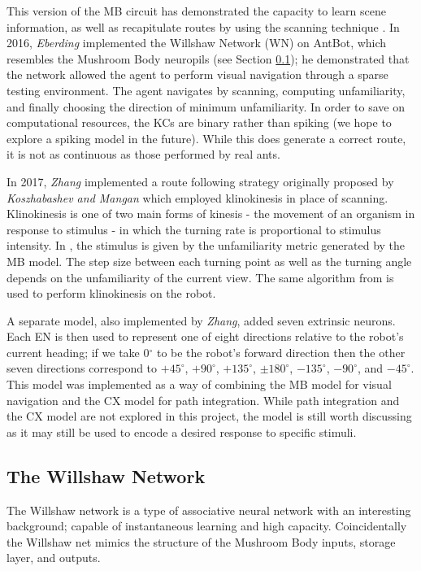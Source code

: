 \documentclass[a4paper,11pt,twoside,openright]{article}
\begin{document}
This version of the MB circuit has demonstrated the capacity to learn scene information, as well
as recapitulate routes by using the scanning technique \cite{Ardin2016}. In 2016, \textit{Eberding}
implemented the Willshaw Network (WN) on AntBot, which resembles the Mushroom Body neuropils (see Section \ref{sec:wn}); he
demonstrated that the network allowed the agent to perform visual navigation through a sparse testing
environment\cite{Eberding2016}. The agent navigates by scanning, computing unfamiliarity, and finally
choosing the direction of minimum unfamiliarity. In order to save on computational resources, the
KCs are binary rather than spiking (we hope to explore a spiking model in the future). While this does
generate a correct route, it is not as continuous as those performed by real ants.
\newline

In 2017, \textit{Zhang} implemented a route following strategy originally proposed by
\textit{Koszhabashev and Mangan} which employed klinokinesis in place of scanning. Klinokinesis
is one of two main forms of kinesis - the movement of an organism in response to stimulus - in which
the turning rate is proportional to stimulus intensity. In \cite{Zhang2017}, the
stimulus is given by the unfamiliarity metric generated by the MB model. The step size between each
turning point as well as the turning angle depends on the unfamiliarity of the current view. The same
algorithm from \cite{Kodzhabashev2015} is used to perform klinokinesis on the robot.
\newline

A separate model, also implemented by \textit{Zhang}, added seven extrinsic neurons. Each EN is then
used to represent one of eight directions relative to the robot's current heading; if we take 0$^\circ$
to be the robot's forward direction then the other seven directions correspond to $+45^\circ$,
$+90^\circ$, $+135^\circ$, $\pm180^\circ$, $-135^\circ$, $-90^\circ$, and $-45^\circ$. This model was implemented as a way of
combining the MB model for visual navigation and the CX model for path integration. While path
integration and the CX model are not explored in this project, the model is still worth discussing
as it may still be used to encode a desired response to specific stimuli.


\subsection{The Willshaw Network} \label{sec:wn}
The Willshaw network is a type of associative neural network with an interesting background; capable of
instantaneous learning and high capacity. Coincidentally the Willshaw net mimics the structure of the Mushroom Body
inputs, storage layer, and outputs.
\newline
\end{document}
